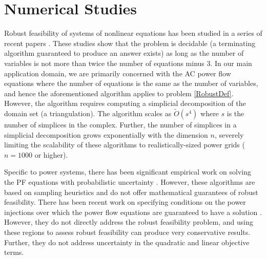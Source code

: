 \section{Numerical Studies} \label{sec:numstd}  

Robust feasibility of systems of nonlinear equations has been studied in a series of recent papers \cite{FrKr2015,FrKrWa2016}.
These studies show that the problem is decidable (a terminating algorithm guaranteed to produce an answer exists) as long as the number of variables is not more than twice the number of equations minus $3$.
In our main application domain, we are primarily concerned with the AC power flow equations
where the number of equations is the same as the number of variables, and hence the aforementioned algorithm \cite{FrKr2015,FrKrWa2016} applies to problem \ref{RobustDef}.
However, the algorithm requires computing a simplicial decomposition of the domain set (a triangulation).
The algorithm scales as $\tilde{O}(s^4)$ where $s$ is the number of simplices in the complex.
Further, the number of simplices in a simplicial decomposition grows exponentially with the dimension $n$, severely limiting the scalability of these algorithms to realistically-sized power grids ($n=1000$ or higher).

Specific to power systems, there has been significant empirical work on solving the PF equations with probabilistic uncertainty \cite{morales2007point,wang1992interval}.
However, these algorithms are based on sampling heuristics and do not offer mathematical guarantees of robust feasibility.
There has been recent work on specifying conditions on the power injections over which the power flow equations are guaranteed to have a solution \cite{bolognani2016existence,EPFLA,EPFLB}.
However, they do not directly address the robust feasibility problem, and using these regions to assess robust feasibility can produce very conservative results.
Further, they do not address uncertainty in the quadratic and linear objective terms.


